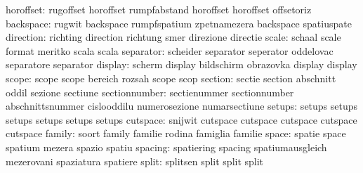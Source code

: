                 horoffset: rugoffset                 horoffset
                           rumpfabstand              horoffset
                           horoffset                 offsetoriz %
                backspace: rugwit                    backspace
                           rumpfspatium              zpetnamezera
                           backspace                 spatiuspate %
                direction: richting                  direction
                           richtung                  smer
                           direzione                 directie
                    scale: schaal                    scale
                           format                    meritko
                           scala                     scala
                separator: scheider                  separator
                           seperator                 oddelovac
                           separatore                separator
                  display: scherm                    display
                           bildschirm                obrazovka
                           display                   display %
                    scope: scope                     scope
                           bereich                   rozsah
                           scope                     scop %
                  section: sectie                    section
                           abschnitt                 oddil
                           sezione                   sectiune
            sectionnumber: sectienummer              sectionnumber
                           abschnittsnummer          cislooddilu
                           numerosezione             numarsectiune
setups: setups setups
        setups setups
        setups setups
                 cutspace: snijwit                   cutspace
                           cutspace                  cutspace
                           cutspace                  cutspace %
                   family: soort                     family
                           familie                   rodina
                           famiglia                  familie
                    space: spatie                    space
                           spatium                   mezera
                           spazio                    spatiu
                  spacing: spatiering                spacing
                           spatiumausgleich          mezerovani
                           spaziatura                spatiere
                    split: splitsen                  split
                           split                     split
